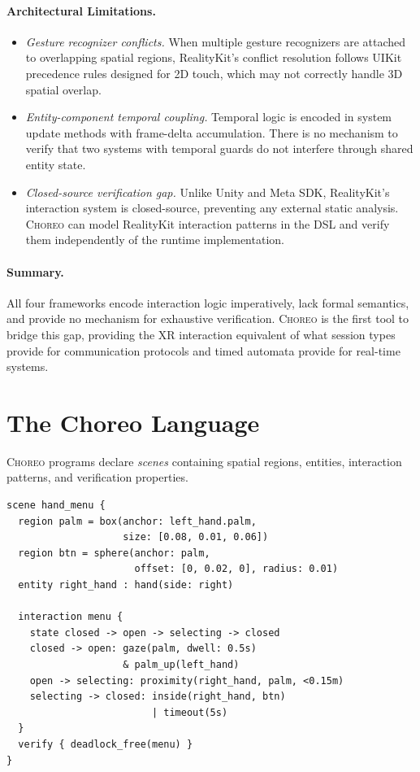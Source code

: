 \documentclass[11pt,a4paper]{article}
\begin{document}
\paragraph{Architectural Limitations.}
\begin{itemize}
\item \emph{Gesture recognizer conflicts.}
  When multiple gesture recognizers are attached to overlapping spatial regions,
  RealityKit's conflict resolution follows UIKit precedence rules designed for 2D
  touch, which may not correctly handle 3D spatial overlap.
\item \emph{Entity-component temporal coupling.}
  Temporal logic is encoded in system update methods with frame-delta accumulation.
  There is no mechanism to verify that two systems with temporal guards do not
  interfere through shared entity state.
\item \emph{Closed-source verification gap.}
  Unlike Unity and Meta SDK, RealityKit's interaction system is closed-source,
  preventing any external static analysis.
  \textsc{Choreo} can model RealityKit interaction patterns in the DSL and
  verify them independently of the runtime implementation.
\end{itemize}

\paragraph{Summary.}
All four frameworks encode interaction logic imperatively, lack formal semantics,
and provide no mechanism for exhaustive verification.
\textsc{Choreo} is the first tool to bridge this gap, providing the XR
interaction equivalent of what session types provide for communication protocols
and timed automata provide for real-time systems.

\section{The Choreo Language}\label{sec:language}

\textsc{Choreo} programs declare \emph{scenes} containing spatial regions, entities,
interaction patterns, and verification properties.

\begin{lstlisting}[language=choreo,caption={A hand menu interaction choreography.},
  label=lst:example]
scene hand_menu {
  region palm = box(anchor: left_hand.palm,
                    size: [0.08, 0.01, 0.06])
  region btn = sphere(anchor: palm,
                      offset: [0, 0.02, 0], radius: 0.01)
  entity right_hand : hand(side: right)

  interaction menu {
    state closed -> open -> selecting -> closed
    closed -> open: gaze(palm, dwell: 0.5s)
                    & palm_up(left_hand)
    open -> selecting: proximity(right_hand, palm, <0.15m)
    selecting -> closed: inside(right_hand, btn)
                         | timeout(5s)
  }
  verify { deadlock_free(menu) }
}
\end{lstlisting}
\end{document}
